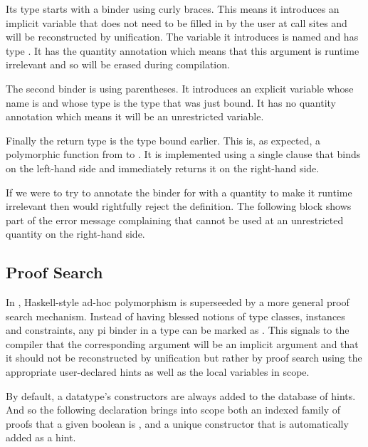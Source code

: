 Its type starts with a binder using curly braces. This means it introduces an implicit
variable that does not need to be filled in by the user at call sites and will be
reconstructed by unification. The variable it introduces is named  and
has type . It has the  quantity annotation which means
that this argument is runtime irrelevant and so will be erased during compilation.

The second binder is using parentheses. It introduces an explicit variable whose name
is  and whose type is the type  that was just bound. It has
no quantity annotation which means it will be an unrestricted variable.

Finally the return type is the type  bound earlier. This is, as expected,
a polymorphic function from  to . It is implemented using
a single clause that binds  on the left-hand side and immediately returns
it on the right-hand side.


If we were to try to annotate the binder for  with a 
quantity to make it runtime irrelevant then \idris{} would
rightfully reject the definition.
%
The following  block shows part of the error message complaining
that  cannot be used at an unrestricted quantity on the right-hand side.




\subsection{Proof Search}\label{sec:proofsearch}

In \idris{}, Haskell-style ad-hoc polymorphism is superseeded by a more general
proof search mechanism.
%
Instead of having blessed notions of type classes, instances and constraints, any
pi binder in a type can be marked as .
%
This signals to the compiler that the corresponding argument will be an implicit
argument and that it should not be reconstructed by unification but rather by
proof search using the appropriate user-declared hints as well as the local
variables in scope.

By default, a datatype's constructors are always added to the database of hints.
And so the following declaration brings into scope both an indexed family
 of proofs that a given boolean is , and a unique
constructor  that is automatically added as a hint.

